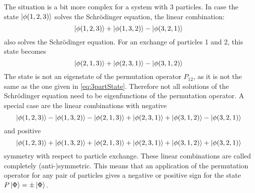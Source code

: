 The situation is a bit more complex for a system with 3 particles. In case the state $\ket{\phi(1,2,3)}$ solves the Schrödinger equation, the linear combination:
\begin{equation}
 \ket{\phi(1,2,3)} + \ket{\phi(1,3,2)} - \ket{\phi(3,2,1)}
 \label{eq:3partState}
\end{equation} 
also solves the Schrödinger equation. For an exchange of particles 1 and 2, this state becomes
\begin{equation}
 \ket{\phi(2,1,3)} + \ket{\phi(2,3,1)} - \ket{\phi(3,1,2)}
\end{equation} 
The state is not an eigenstate of the permutation operator $P_{12}$, as it is not the same as the one given in \ref{eq:3partState}. Therefore not all solutions of the Schrödinger equation need to be eigenfunctions of the permutation operator. A special case are the linear combinations with negative
\begin{equation}
 \ket{\phi(1,2,3)} - \ket{\phi(1,3,2)} - \ket{\phi(2,1,3)} + \ket{\phi(2,3,1)} + \ket{\phi(3,1,2)} - \ket{\phi(3,2,1)}
\end{equation} 
and positive
\begin{equation}
 \ket{\phi(1,2,3)} + \ket{\phi(1,3,2)} + \ket{\phi(2,1,3)} + \ket{\phi(2,3,1)} + \ket{\phi(3,1,2)} + \ket{\phi(3,2,1)}
\end{equation} 
symmetry with respect to particle exchange. These linear combinations are called completely (anti-)symmetric. This means that an application of the permutation operator for any pair of particles gives a negative or positive sign for the state $P\ket{\Phi}=\pm\ket{\Phi}$.

